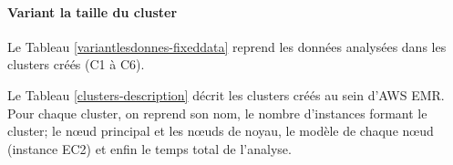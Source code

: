 \paragraph{Variant la taille du cluster}

Le Tableau 	\ref{variantlesdonnes-fixeddata} reprend les données analysées dans les clusters créés (C1 à C6).

\begin{table}[H]
	\centering
	\caption{Les données analysées dans les clusters C1 à C6 }
	\label{variantlesdonnes-fixeddata}
\end{table}

Le Tableau \ref{clusters-description} décrit les clusters créés au sein d'AWS EMR. Pour chaque cluster, on reprend son nom, le nombre d'instances formant le cluster; le n\oe{}ud principal et  les n\oe{}uds de noyau, le modèle de chaque n\oe{}ud (instance EC2) et enfin le temps total de l'analyse. 

\begin{table}[H]
	\centering
\caption{Description des clusters utilisés avec le temps total d'exécution sur les données A}
\label{clusters-description}
\end{table}

